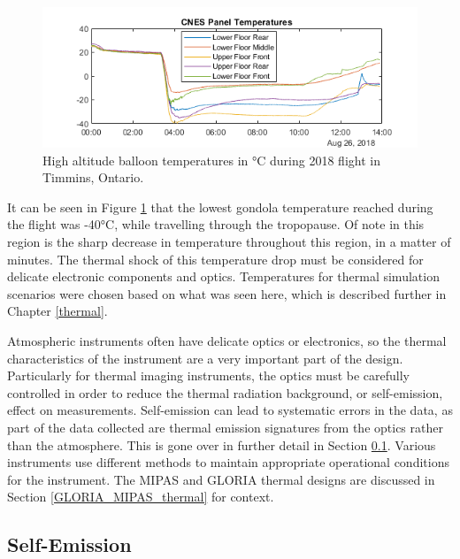  \begin{figure}[h!]
\centering
  \includegraphics{chap2_images/CNES_temps_CATS_2018.png}
  \caption{High altitude balloon temperatures in °C during 2018 flight in Timmins, Ontario.}
  \label{fig:2018_timmins_temps}
\end{figure}

It can be seen in Figure \ref{fig:2018_timmins_temps} that the lowest gondola temperature reached during the flight was -40°C, while travelling through the tropopause. Of note in this region is the sharp decrease in temperature throughout this region, in a matter of minutes. The thermal shock of this temperature drop must be considered for delicate electronic components and optics. Temperatures for thermal simulation scenarios were chosen based on what was seen here, which is described further in Chapter \ref{thermal}.

Atmospheric instruments often have delicate optics or electronics, so the thermal characteristics of the instrument are a very important part of the design. Particularly for thermal imaging instruments, the optics must be carefully controlled in order to reduce the thermal radiation background, or self-emission, effect on measurements. Self-emission can lead to systematic errors in the data, as part of the data collected are thermal emission signatures from the optics rather than the atmosphere. This is gone over in further detail in Section \ref{self-emission}. Various instruments use different methods to maintain appropriate operational conditions for the instrument. The MIPAS and GLORIA thermal designs are discussed in Section \ref{GLORIA_MIPAS_thermal} for context. 

\subsection{Self-Emission}\label{self-emission}


